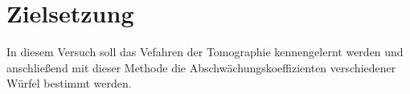 \section{Zielsetzung}
\label{sec:zielsetzung}
In diesem Versuch soll das Vefahren der Tomographie kennengelernt werden und anschließend mit dieser Methode die Abschwächungskoeffizienten verschiedener
Würfel bestimmt werden.
